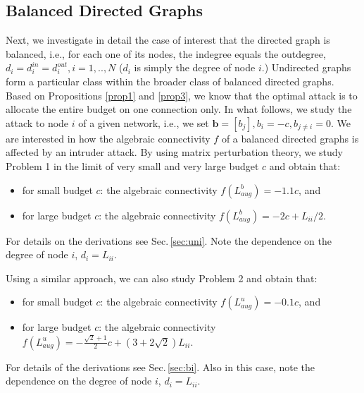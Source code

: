 \documentclass[%
 reprint,
 amsmath,amssymb,
 aip,
]{revtex4-2}
\def \bb {\pmb{b}}
\theoremstyle{italichead}
\theoremstyle{definition}
\begin{document}
{



\subsection{Balanced Directed Graphs} \label{sec:balanced}

Next, we investigate in detail the case of interest that the directed graph is balanced, i.e., for each one of its nodes, the indegree equals the outdegree, $d_i=d_i^{in}=d_i^{out}, i=1,..,N$ ($d_i$ is simply the degree of node $i$.) Undirected graphs form a particular class within the broader class of balanced directed graphs. %
{
Based on Propositions \ref{prop1} and \ref{prop3}, we know that the optimal attack is to allocate the entire budget on one connection only. %
In what follows, we study the attack to node $i$ of a given network, i.e., we set $\bb = [b_j], b_i = -c, b_{j\neq i} = 0$.
}
We are interested in how the algebraic connectivity $f$ of a balanced directed graphs is affected by an intruder attack. 
By using matrix perturbation theory, we study {Problem 1} in the limit of very small and very large budget $c$ and obtain that:
\begin{itemize}
    \item for small budget $c$: the algebraic connectivity $f(L_{aug}^b) = -1.1c$, and
    \item for large budget $c$: the algebraic connectivity $f(L_{aug}^b) = -2c + L_{ii}/2$.
\end{itemize}
For details on the derivations see Sec.\,\ref{sec:uni}.
Note the dependence on the degree of  node $i$, $d_i=L_{ii}$.


Using a similar approach, we can also study {Problem 2} and obtain that:

\begin{itemize}
    \item for small budget $c$: the algebraic connectivity $f(L_{aug}^u) = -0.1c$, and
    \item for large budget $c$: the algebraic connectivity $f(L_{aug}^u) = -\frac{\sqrt{2}+1}{2}c + (3+2\sqrt{2})  L_{ii}$.
\end{itemize}
For details of the derivations see Sec.\,\ref{sec:bi}. Also in this case, note the dependence on the degree of  node $i$, $d_i=L_{ii}$.


}
\end{document}
